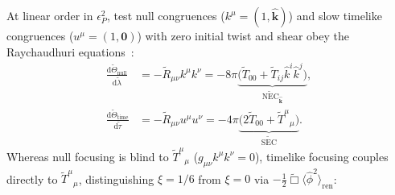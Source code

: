 \documentclass[aps,prd,twocolumn,10pt,showkeys,nofootinbib,floatfix,longbibliography]{revtex4-2}
\newcommand{\dd}{\mathrm{d}}
\begin{document}
At linear order in $\epsilon_P^2$, test null congruences ($k^\mu = (1, \hat{\mathbf{k}})$) and slow timelike congruences ($u^\mu = (1, \mathbf{0})$) with zero initial twist and shear obey the Raychaudhuri equations~\cite{raychaudhuri1955,wald1984,kontou2020}:
\begin{align}
\frac{\dd\tilde{\Theta}_{\mathrm{null}}}{\dd\tilde{\lambda}} &= -\tilde{R}_{\mu\nu} k^\mu k^\nu = -8\pi \underbrace{\bigl(\tilde{T}_{00} + \tilde{T}_{ij}\hat{k}^i\hat{k}^j\bigr)}_{\widetilde{\mathrm{NEC}}_{\hat{\mathbf{k}}}}, \label{eq:raychaudhuri_null}\\
\frac{\dd\tilde{\Theta}_{\mathrm{time}}}{\dd\tilde{\tau}} &= -\tilde{R}_{\mu\nu} u^\mu u^\nu = -4\pi \underbrace{\bigl(2\tilde{T}_{00} + \tilde{T}^\mu{}_\mu\bigr)}_{\widetilde{\mathrm{SEC}}}. \label{eq:raychaudhuri_time}
\end{align}
Whereas null focusing is blind to $\tilde{T}^\mu{}_\mu$ ($g_{\mu\nu}k^\mu k^\nu = 0$), timelike focusing couples directly to $\tilde{T}^\mu{}_\mu$, distinguishing $\xi = 1/6$ from $\xi = 0$ via $-\frac{1}{2}\tilde{\Box}\langle\hat{\phi}^2\rangle_{\mathrm{ren}}$:
\end{document}
